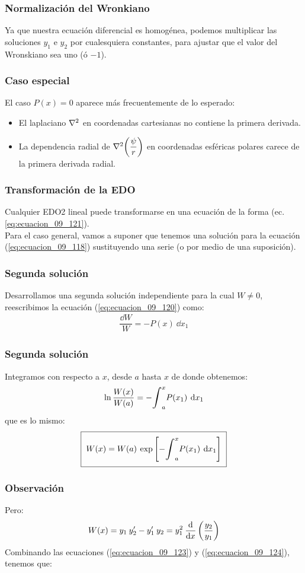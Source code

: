 \documentclass[12pt]{beamer}
\begin{document}
\begin{frame}
\frametitle{Normalización del Wronkiano}
Ya que nuestra ecuación diferencial es homogénea, podemos multiplicar las soluciones $y_{1}$ e $y_{2}$ por cualesquiera constantes, para ajustar que el valor del Wronskiano sea uno (ó $-1$).
\end{frame}
\begin{frame}
\frametitle{Caso especial}
El caso $P(x) = 0$ aparece más frecuentemente de lo esperado:
\pause
\begin{itemize}[<+->]
\item[\ding{212}] El laplaciano $\laplacian$ en coordenadas cartesianas no contiene la primera derivada.
\item[\ding{212}] La dependencia radial de $\laplacian (\dfrac{\psi}{r})$ en coordenadas esféricas polares carece de la primera derivada radial.
\end{itemize}
\end{frame}
\begin{frame}
\frametitle{Transformación de la EDO}
Cualquier EDO2 lineal puede transformarse en una ecuación de la forma (ec. \ref{eq:ecuacion_09_121}).
\\
\bigskip
\pause
Para el caso general, vamos a suponer que tenemos una solución para la ecuación (\ref{eq:ecuacion_09_118}) sustituyendo una serie (o por medio de una suposición). 
\end{frame}
\begin{frame}
\frametitle{Segunda solución}
Desarrollamos una segunda solución independiente para la cual $W \neq 0$, reescribimos la ecuación (\ref{eq:ecuacion_09_120}) como:
\pause
\begin{align*}
\dfrac{\dd{W}}{W} = - P(x) \: \dd{x_{1}}
\end{align*}
\end{frame}
\begin{frame}
\frametitle{Segunda solución}
Integramos con respecto a $x$, desde $a$ hasta $x$ de donde obtenemos:
\pause
\begin{align*}
\ln \dfrac{W(x)}{W(a)} = - \scaleint{6ex}_{a}^{x} P(x_{1}) \: \dd{x_{1}}
\end{align*}
\pause
que es lo mismo:
\pause
\begin{align}
\setlength{\fboxsep}{2\fboxsep}\boxed{W(x) = W(a) \: \exp \left[ - \scaleint{6ex}_{a}^{x} P(x_{1}) \: \dd{x_{1}} \right]}
\label{eq:ecuacion_09_123}
\end{align}
\end{frame}
\begin{frame}
\frametitle{Observación}
Pero:
\pause
\begin{align}
W(x) = y_{1} \: {y}^{\prime}_{2} - {y}^{\prime}_{1} \: y_{2} = y_{1}^{2} \: \dv{x} \left( \dfrac{y_{2}}{y_{1}} \right)
\label{eq:ecuacion_09_124}
\end{align}
Combinando las ecuaciones (\ref{eq:ecuacion_09_123}) y (\ref{eq:ecuacion_09_124}), tenemos que:
\end{frame}
\end{document}
